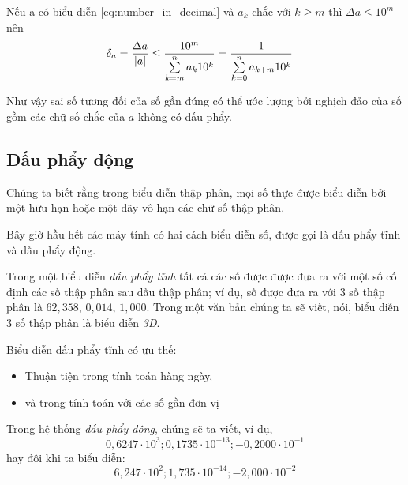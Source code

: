 \documentclass{book}    %
\DeclarePairedDelimiter\abs{\lvert}{\rvert}%
\begin{document}
Nếu a có biểu diễn \ref{eq:number_in_decimal} và \(a_k\) chắc với \(k \geq m\)
thì \(\Delta a \leq 10^m\) nên
\begin{equation*}
    \begin{aligned}
        \delta_a = \frac{\Delta a}{\abs{a}} \leq \frac{10^m}{\sum\limits_{k=m}\limits^{n} a_k 10^k} &= \frac{1}{\sum\limits_{k=0}\limits^{n} a_{k+m} 10^k}
    \end{aligned}
\end{equation*}

Như vậy sai số tương đối của số gần đúng có thể ước lượng bởi nghịch đảo của số
gồm các chữ số chắc của \(a\) không có dấu phẩy.

\subsection{Dấu phẩy động}

Chúng ta biết rằng trong biểu diễn thập phân, mọi số thực được biểu diễn bởi một
hữu hạn hoặc một dãy vô hạn các chữ số thập phân.

Bây giờ hầu hết các máy tính có hai cách biểu diễn số, được gọi là dấu phẩy tĩnh
và dấu phẩy động.

Trong một biểu diễn \emph{dấu phẩy tĩnh} tất cả các số được được đưa ra với một
số cố định các số thập phân sau dấu thập phân; ví dụ, số được đưa ra với 3 số
thập phân là \(62,358\), \(0,014\), \(1,000\). Trong một văn bản chúng ta sẽ
viết, nói, biểu diễn 3 số thập phân là biểu diễn \emph{3D}.

Biểu diễn dấu phẩy tĩnh có ưu thế:
\begin{itemize}
    \item Thuận tiện trong tính toán hàng ngày,
    \item và trong tính toán với các số gần đơn vị
\end{itemize}

Trong hệ thống \emph{dấu phẩy động}, chúng sẽ ta viết, ví dụ,
\begin{equation*}
    0,6247 \cdot 10^3; 0,1735 \cdot 10^{-13}; -0,2000 \cdot 10^{-1}
\end{equation*}
hay đôi khi ta biểu diễn:
\begin{equation*}
    6,247 \cdot 10^2; 1,735 \cdot 10^{-14}; -2,000 \cdot 10^{-2}
\end{equation*}
\end{document}
